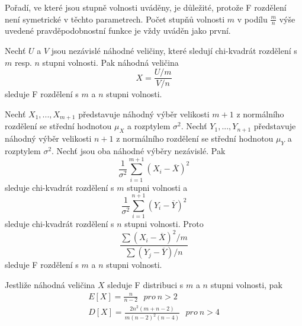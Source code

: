 Pořadí, ve které jsou stupně volnosti uváděny, je důležité, protože F rozdělení není symetrické v těchto parametrech. Počet stupňů volnosti $m$ v podílu $\frac{m}{n}$ výše uvedené pravděpodobnostní funkce je vždy uváděn jako první.

\begin{theorem}
Nechť $U$ a $V$ jsou nezávislé náhodné veličiny, které sledují chi-kvadrát rozdělení s $m$ resp. $n$ stupni volnosti. Pak náhodná veličina
\begin{equation*}
X = \frac{U/m}{V/n}
\end{equation*}
sleduje F rozdělení s $m$ a $n$ stupni volnosti.
\end{theorem}

\begin{corollary}
Nechť $X_1, ..., X_{m+1}$ představuje náhodný výběr velikosti $m+1$ z normálního rozdělení se střední hodnotou $\mu_X$ a rozptylem $\sigma^2$. Nechť $Y_1, ..., Y_{n+1}$ představuje náhodný výběr velikosti $n+1$ z normálního rozdělení se střední hodnotou $\mu_Y$ a rozptylem $\sigma^2$. Nechť jsou oba náhodné výběry nezávislé. Pak
\begin{equation*}
\frac{1}{\sigma^2}\sum_{i = 1}^{m+1}(X_i - \overline{X})^2
\end{equation*}
sleduje chi-kvadrát rozdělení s $m$ stupni volnosti a
\begin{equation*}
\frac{1}{\sigma^2}\sum_{i = 1}^{n+1}(Y_i - \overline{Y})^2
\end{equation*}
sleduje chi-kvadrát rozdělení s $n$ stupni volnosti. Proto
\begin{equation*}
\frac{\sum(X_i - \overline{X})^2/m}{\sum(Y_j - \overline{Y})/n}
\end{equation*}
sleduje F rozdělení s $m$ a $n$ stupni volnosti.
\end{corollary}

\begin{theorem}
Jestliže náhodná veličina $X$ sleduje F distribuci s $m$ a $n$ stupni volnosti, pak
\begin{gather*}
E[X] = \frac{n}{n - 2} ~~~ \textit{pro} ~ n > 2\\
D[X] = \frac{2 n ^2 (m + n - 2)}{m(n - 2)^2(n - 4)} ~~~ \textit{pro} ~ n > 4
\end{gather*}
\end{theorem}

